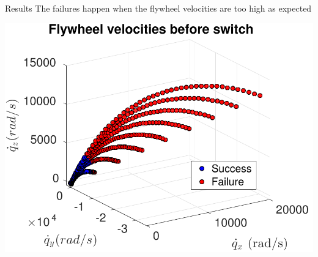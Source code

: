 \begin{frame}{Results}
  The failures happen when the flywheel velocities are too high as expected
  \par
  \centering
  \includegraphics[scale=0.62]{simulation_lqr_velocities}
\end{frame}

